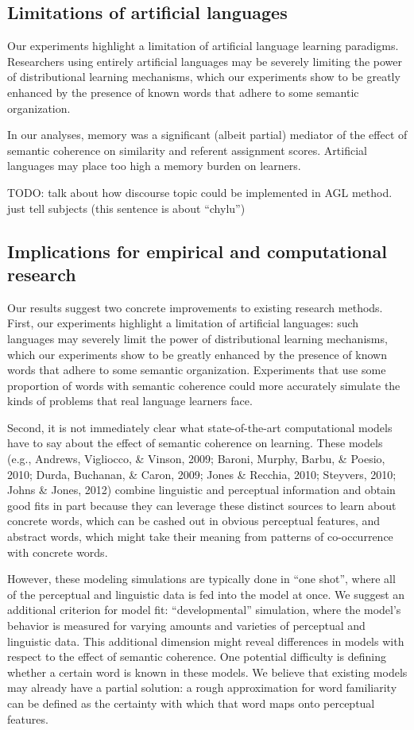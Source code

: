 \documentclass[man,floatsintext]{apa6}
\begin{document}
\subsection{Limitations of artificial languages}

Our experiments highlight a limitation of artificial language learning
paradigms. Researchers using entirely artificial languages may be
severely limiting the power of distributional learning mechanisms,
which our experiments show to be greatly enhanced by the presence of
known words that adhere to some semantic organization.

In our analyses, memory was a significant (albeit partial) mediator of
the effect of semantic coherence on similarity and referent assignment
scores. Artificial languages may place too high a memory burden on
learners.

TODO: talk about how discourse topic could be implemented in AGL
method. just tell subjects (this sentence is about ``chylu'')

\subsection{Implications for empirical and computational research}

Our results suggest two concrete improvements to existing research
methods. First, our experiments highlight a limitation of artificial
languages: such languages may severely limit the power of
distributional learning mechanisms, which our experiments show to be
greatly enhanced by the presence of known words that adhere to some
semantic organization. Experiments that use some proportion of words
with semantic coherence could more accurately simulate the kinds of
problems that real language learners face.

Second, it is not immediately clear what state-of-the-art
computational models have to say about the effect of semantic
coherence on learning. These models (e.g., Andrews, Vigliocco, \&
Vinson, 2009; Baroni, Murphy, Barbu, \& Poesio, 2010; Durda, Buchanan,
\& Caron, 2009; Jones \& Recchia, 2010; Steyvers, 2010; Johns \&
Jones, 2012) combine linguistic and perceptual information and obtain
good fits in part because they can leverage these distinct sources to
learn about concrete words, which can be cashed out in obvious
perceptual features, and abstract words, which might take their
meaning from patterns of co-occurrence with concrete words.

However, these modeling simulations are typically done in ``one
shot'', where all of the perceptual and linguistic data is fed into
the model at once. We suggest an additional criterion for model fit:
``developmental'' simulation, where the model's behavior is measured
for varying amounts and varieties of perceptual and linguistic
data. This additional dimension might reveal differences in models
with respect to the effect of semantic coherence. One potential
difficulty is defining whether a certain word is known in these
models. We believe that existing models may already have a partial
solution: a rough approximation for word familiarity can be defined as
the certainty with which that word maps onto perceptual features.
\end{document}
